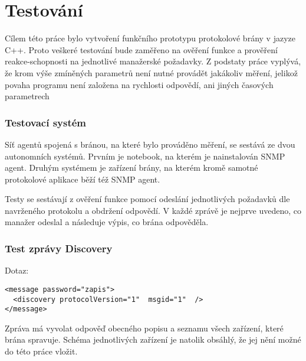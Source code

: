 \chapter{Testování}
\label{kap_testovani}
Cílem této práce bylo vytvoření funkčního prototypu protokolové brány v jazyze C++. Proto
veškeré testování bude zaměřeno na ověření funkce a prověření reakce-schopnosti na jednotlivé
manažerské požadavky. Z podstaty práce vyplývá, že krom výše zmíněných parametrů není nutné provádět
jakákoliv měření, jelikož povaha programu není založena na rychlosti odpovědí, ani jiných časových parametrech

\subsection*{Testovací systém}
Síť agentů spojená s bránou, na které bylo prováděno měření, se sestává ze dvou autonomních systémů.
Prvním je notebook, na kterém je nainstalován SNMP agent. Druhým systémem je zařízení brány, na kterém
kromě samotné protokolové aplikace běží též SNMP agent.

Testy se sestávají z ověření funkce pomocí odeslání jednotlivých požadavků dle navrženého protokolu a obdržení odpovědí.
V každé zprávě je nejprve uvedeno, co manažer odeslal a následuje výpis, co brána odpověděla.

\subsection*{Test zprávy Discovery}
Dotaz:
\begin{verbatim}
<message password="zapis">
  <discovery protocolVersion="1"  msgid="1"  />
</message>
\end{verbatim}

Zpráva má vyvolat odpověď obecného popisu a seznamu všech zařízení, které brána spravuje. Schéma
jednotlivých zařízení je natolik obsáhlý, že jej nění možné do této práce vložit.

